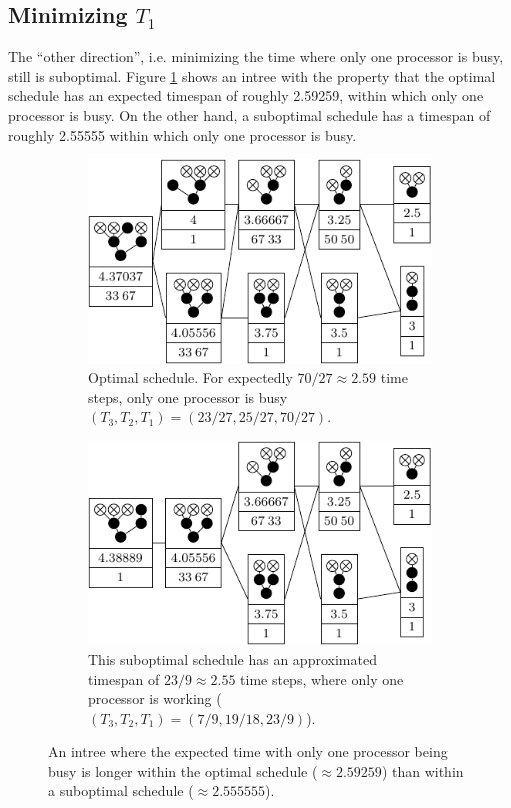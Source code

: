 \subsection{Minimizing $T_1$}
\label{sec:p3-disproving-short-p1}

The ``other direction'', i.e. minimizing the time where only one processor is busy, still is suboptimal.
Figure \ref{fig:p3-p1s-suboptimal-example} shows an intree with the property that the optimal schedule has an expected timespan of roughly 2.59259, within which only one processor is busy. On the other hand, a suboptimal schedule has a timespan of roughly 2.55555 within which only one processor is busy.

\begin{figure}[ht]
  \centering
  \begin{subfigure}{.45\linewidth}
    \centering
    \includegraphics{p3/keep_1_unbusy/one_unbusy_opt.pdf}
    \caption{Optimal schedule. For expectedly $70/27\approx 2.59$ time steps, only one processor is busy $(T_3, T_2, T_1)=(23/27, 25/27, 70/27)$.}
  \end{subfigure}
  \quad
  \begin{subfigure}{.45\linewidth}
    \centering
    \includegraphics{p3/keep_1_unbusy/one_unbusy_subopt.pdf}
    \caption{This suboptimal schedule has an approximated timespan of $23/9\approx 2.55$ time steps, where only one processor is working ($(T_3, T_2, T_1)=(7/9,19/18,23/9)$).}
  \end{subfigure}
  \caption{An intree where the expected time with only one processor being busy is longer within the optimal schedule ($\approx 2.59259$) than within a suboptimal schedule ($\approx 2.555555$). }
  \label{fig:p3-p1s-suboptimal-example}
\end{figure}

